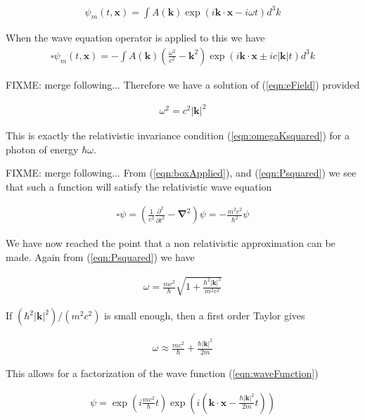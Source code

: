 \documentclass[]{eliblog}
\newcommand{\Abs}[1]{{\left\lvert{#1}\right\rvert}}
\newcommand{\Bk}[0]{\mathbf{k}}
\newcommand{\Bx}[0]{\mathbf{x}}
\newcommand{\spacegrad}[0]{\boldsymbol{\nabla}}
\newcommand{\delambertian}[0]{\square}
\begin{document}
\begin{align}\label{eqn:wavefunctionMatter}
{\psi_m}(t,\Bx) = \int A(\Bk) \exp\left( i \Bk \cdot \Bx - i \omega t \right) d^3 k
\end{align}

When the wave equation operator is applied to this we have
\begin{align}
\delambertian {\psi_m}(t,\Bx) = 
-\int A(\Bk) \left( \frac{\omega^2}{c^2} - \Bk^2 \right)\exp\left( i \Bk \cdot \Bx \pm i c \Abs{\Bk} t \right) d^3 k
\end{align}

FIXME: merge following...
Therefore we have a solution of (\ref{eqn:eField}) provided

\begin{align}
\omega^2 = c^2 \Abs{\Bk}^2
\end{align}

This is exactly the relativistic invariance condition (\ref{eqn:omegaKsquared}) for a photon of energy $\hbar \omega$.

FIXME: merge following...
From (\ref{eqn:boxApplied}), and
(\ref{eqn:Psquared})
we see that such a function will satisfy the relativistic wave equation

\begin{align}
\delambertian \psi = \left( \frac{1}{c^2}\frac{\partial^2}{{\partial t}^2} - \spacegrad^2 \right) \psi = - \frac{m^2 c^2}{\hbar^2} \psi
\end{align}

We have now reached the point that a non relativistic approximation can be made.
Again from (\ref{eqn:Psquared}) we have

\begin{align}
\omega = \frac{m c^2}{\hbar} \sqrt{ 1 + \frac{\hbar^2 \Abs{\Bk}^2}{m^2 c^2}}
\end{align}

If $(\hbar^2 \Abs{\Bk}^2)/(m^2 c^2)$ is small enough, then a first order Taylor gives

\begin{align}
\omega \approx \frac{m c^2}{\hbar} + \frac{\hbar \Abs{\Bk}^2}{2 m}
\end{align}

This allows for a factorization of the wave function (\ref{eqn:waveFunction})

\begin{align}\label{eqn:intermed}
\psi =
\exp\left( i \frac{m c^2}{\hbar} t \right)
\exp\left( i \left(
\Bk \cdot \Bx
-\frac{\hbar \Abs{\Bk}^2}{2 m}t
\right) \right)
\end{align}
\end{document}
